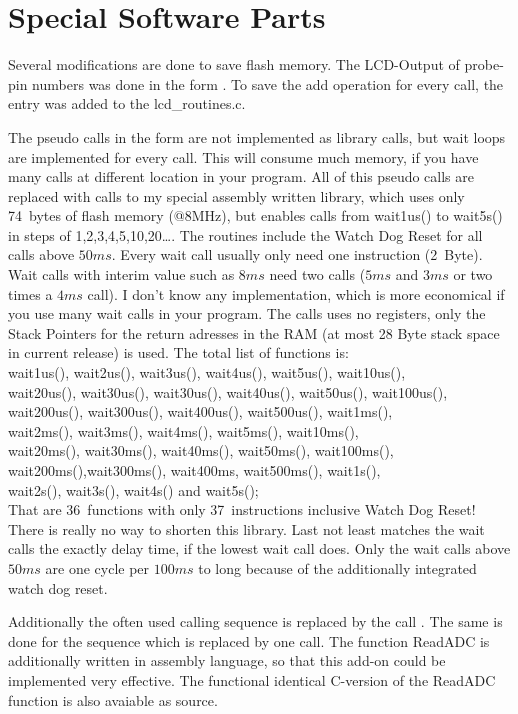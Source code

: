
\chapter{Special Software Parts}

Several modifications are done to save flash memory.
The LCD-Output of probe-pin numbers was done in the form .
To save the add operation for every call, the entry 
was added to the lcd\_routines.c.


The pseudo calls in the form  are not implemented as library calls,
but wait loops are implemented for every call. This will consume much memory, if you
have many calls at different location in your program.
All of this pseudo calls are replaced with calls to my special assembly written library,
which uses only 74~bytes of flash memory (@8MHz), but enables calls from wait1us() to wait5s()
in steps of 1,2,3,4,5,10,20\dots . The routines  include the Watch Dog Reset for all calls
above \(50ms\). Every wait call usually only need one instruction (2~Byte). Wait calls
with interim value such as \(8ms\) need two calls (\(5ms\) and \(3ms\) or two times a \(4ms\) call).
I don't know any implementation, which is more economical if you use many wait calls in your program.
The calls uses no registers, only the Stack Pointers for the return adresses
in the RAM (at most 28 Byte stack space in current release) is used.
The total list of functions is:\\
wait1us(), wait2us(), wait3us(), wait4us(), wait5us(), wait10us(), \\
wait20us(), wait30us(), wait30us(), wait40us(), wait50us(), wait100us(), \\
wait200us(), wait300us(), wait400us(), wait500us(), wait1ms(),\\
wait2ms(), wait3ms(), wait4ms(), wait5ms(), wait10ms(),\\
wait20ms(), wait30ms(), wait40ms(), wait50ms(), wait100ms(),\\
wait200ms(),wait300ms(), wait400ms, wait500ms(), wait1s(),\\
wait2s(), wait3s(), wait4s() and wait5s();\\
That are 36~functions with only 37~instructions inclusive Watch Dog Reset!
There is really no way to shorten this library.
Last not least matches the wait calls the exactly delay time, if the lowest wait call does.
Only the wait calls above \(50ms\) are one cycle per \(100ms\) to long because of the additionally integrated watch dog reset.


Additionally the often used calling sequence  is replaced by the call
.
The same is done for the sequence  which is replaced by one 
 call.
The function ReadADC is additionally written in assembly language, so that this add-on could be
implemented very effective. The functional identical C-version of the ReadADC function is
also avaiable as source.
